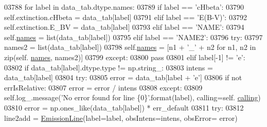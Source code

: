 \begin{DoxyCode}
03788             \textcolor{keywordflow}{for} label \textcolor{keywordflow}{in} data\_tab.dtype.names:
03789                 \textcolor{keywordflow}{if} label == \textcolor{stringliteral}{'cHbeta'}:
03790                     self.extinction.cHbeta = data\_tab[label]
03791                 \textcolor{keywordflow}{elif} label == \textcolor{stringliteral}{'E(B-V)'}:
03792                     self.extinction.E\_BV = data\_tab[label]
03793                 \textcolor{keywordflow}{elif} label == \textcolor{stringliteral}{'NAME'}:
03794                     self.\hyperlink{classpyneb_1_1core_1_1pynebcore_1_1_observation_a3f365d0b1488b2eba300bf71caf23c17}{names} = list(data\_tab[label])
03795                 \textcolor{keywordflow}{elif} label == \textcolor{stringliteral}{'NAME2'}:
03796                     \textcolor{keywordflow}{try}:
03797                         names2 = list(data\_tab[label])
03798                         self.\hyperlink{classpyneb_1_1core_1_1pynebcore_1_1_observation_a3f365d0b1488b2eba300bf71caf23c17}{names} = [n1 + \textcolor{stringliteral}{'\_'} + n2 \textcolor{keywordflow}{for} n1, n2 \textcolor{keywordflow}{in} zip(self.
      \hyperlink{classpyneb_1_1core_1_1pynebcore_1_1_observation_a3f365d0b1488b2eba300bf71caf23c17}{names}, names2)]
03799                     \textcolor{keywordflow}{except}:
03800                         \textcolor{keywordflow}{pass}
03801                 \textcolor{keywordflow}{elif} label[-1] != \textcolor{stringliteral}{'e'}:
03802                     \textcolor{keywordflow}{if} data\_tab[label].dtype.type != np.string\_:
03803                         intens = data\_tab[label]
03804                         \textcolor{keywordflow}{try}:
03805                             error = data\_tab[label + \textcolor{stringliteral}{'e'}]
03806                             \textcolor{keywordflow}{if} \textcolor{keywordflow}{not} errIsRelative:
03807                                 error = error / intens
03808                         \textcolor{keywordflow}{except}:
03809                             self.log\_.message(\textcolor{stringliteral}{'No error found for line \{0\}'}.format(label), calling=self.
      \hyperlink{classpyneb_1_1core_1_1pynebcore_1_1_observation_a2639fad9af4fefad20e4097295bd40e7}{calling})
03810                             error = np.ones\_like(data\_tab[label]) * err\_default
03811                         \textcolor{keywordflow}{try}:
03812                             line2add = \hyperlink{classpyneb_1_1core_1_1pynebcore_1_1_emission_line}{EmissionLine}(label=label, obsIntens=intens, obsError=
      error)

\end{DoxyCode}
